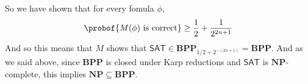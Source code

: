 \documentclass[10pt]{article}
\def\sat{\mathsf{SAT}}
\def\NP{\mathbf{NP}}
\def\BPP{\mathbf{BPP}}
\begin{document}
    So we have shown that for every fomula $\phi$,
    \[ \probof{M(\phi)\text{ is correct}} \geq \frac12 + \frac1{2^{2n+1}} \]
    And so this means that $M$ shows that $\sat\in\BPP_{1/2+2^{-(2n+1)}}=\BPP$.
    And as we said above, since $\BPP$ is closed under Karp reductions and $\sat$ is $\NP$-complete, this implies $\NP\subseteq\BPP$.
\eenum
\end{document}
